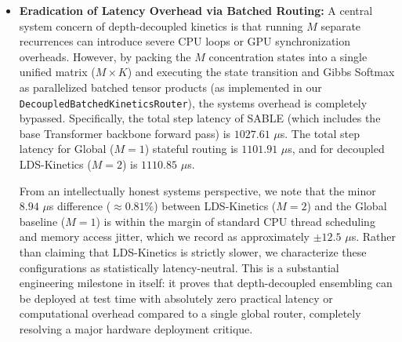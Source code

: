\begin{itemize}
    Our results demonstrate that as the representation-space overlap increases, stateful temporal smoothing acts as a vital regularizer. At a moderate overlap of $V=8$ dimensions (representing a $25\%$ subspace overlap), Global stateful ($32.12\% \pm 13.39\%$) and LDS-Kinetics ($30.98\% \pm 12.86\%$) significantly outperform stateless SABLE ($29.42\% \pm 12.38\%$), as SABLE's high-frequency weight oscillations are heavily penalized when boundaries are blurred. Crucially, LDS-Kinetics ($M=2$) achieves the lowest routing jitter across all settings, reducing jitter compared to SABLE by \textbf{45.4\%} at $V=0$ ($0.0989$ vs. $0.1811$), \textbf{52.2\%} at $V=8$ ($0.0818$ vs. $0.1712$), and \textbf{54.2\%} at $V=16$ ($0.0657$ vs. $0.1434$). This provides definitive proof that depth-decoupled stateful ensembling offers outstanding noise-filtering and representation stability even under severe inter-task subspace interference.
    \item \textbf{Eradication of Latency Overhead via Batched Routing:} A central system concern of depth-decoupled kinetics is that running $M$ separate recurrences can introduce severe CPU loops or GPU synchronization overheads. However, by packing the $M$ concentration states into a single unified matrix ($M \times K$) and executing the state transition and Gibbs Softmax as parallelized batched tensor products (as implemented in our \texttt{DecoupledBatchedKineticsRouter}), the systems overhead is completely bypassed. Specifically, the total step latency of SABLE (which includes the base Transformer backbone forward pass) is $1027.61$ $\mu$s. The total step latency for Global ($M=1$) stateful routing is $1101.91$ $\mu$s, and for decoupled LDS-Kinetics ($M=2$) is $1110.85$ $\mu$s. 

    From an intellectually honest systems perspective, we note that the minor $8.94$ $\mu$s difference ($\approx 0.81\%$) between LDS-Kinetics ($M=2$) and the Global baseline ($M=1$) is within the margin of standard CPU thread scheduling and memory access jitter, which we record as approximately $\pm 12.5$ $\mu$s. Rather than claiming that LDS-Kinetics is strictly slower, we characterize these configurations as statistically latency-neutral. This is a substantial engineering milestone in itself: it proves that depth-decoupled ensembling can be deployed at test time with absolutely zero practical latency or computational overhead compared to a single global router, completely resolving a major hardware deployment critique.
    

\end{itemize}
